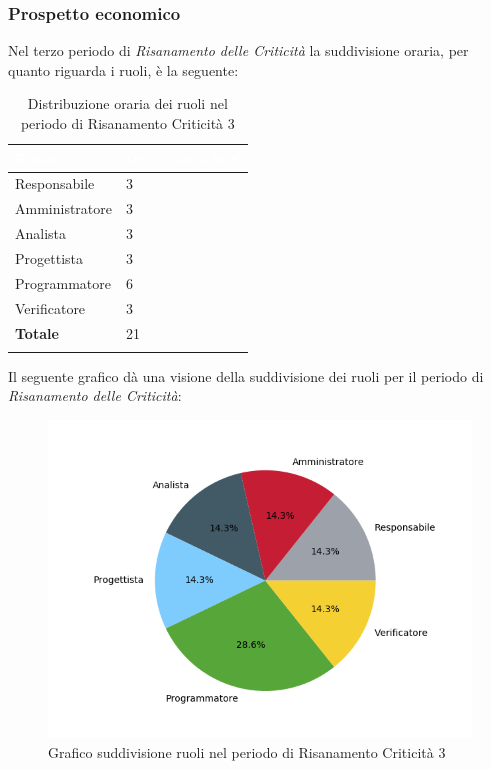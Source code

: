 \subsubsection{Prospetto economico}
Nel terzo periodo di \textit{Risanamento delle Criticità} la suddivisione oraria, per quanto riguarda i ruoli, è la seguente: 

\begin{longtable}{| C{.30\textwidth}| C{.15\textwidth}| C{.20\textwidth}|}
	\hline
	\textbf{\textcolor{white}{Ruolo}} & \textbf{\textcolor{white}{Ore}} & \textbf{\textcolor{white}{Costo 	in \euro}} \\
	\hline 
	Responsabile & 3 &  \\
	\hline
	Amministratore & 3 &  \\
	\hline
	Analista & 3 &  \\
	\hline
	Progettista & 3 & \\
	\hline
	Programmatore & 6 &  \\
	\hline 
	Verificatore & 3 &  \\
	\hline
	\textbf{Totale} & 21 &  \\
	\hline 


\caption{Distribuzione oraria dei ruoli nel periodo di Risanamento Criticità 3}
\label{Distribuzione oraria per ruoli rc3}
\end{longtable}

Il seguente grafico dà una visione della suddivisione dei ruoli per il periodo di  \textit{Risanamento delle Criticità}:\begin{figure}[H]
	\centering
	\includegraphics[width=1\linewidth]{./images/torta_rc3.png}
	\caption{Grafico suddivisione ruoli nel periodo di Risanamento Criticità 3}
	\label{fig:grafico suddivione ruoli rc3}
\end{figure}

